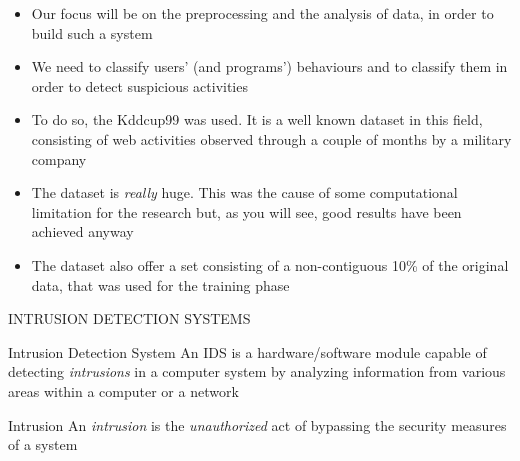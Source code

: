 	\begin{frame}
		\begin{itemize}
			\item Our focus will be on the preprocessing and the analysis of data, in order to build such a system
			\vspace{0.3cm}
			\item We need to classify users' (and programs') behaviours and to classify them in order to detect suspicious activities
			\vspace{0.3cm}			
			\item To do so, the Kddcup99 was used. It is a well known dataset in this field, consisting of web activities observed through a couple of months by a military company
			\vspace{0.3cm}
			\item The dataset is \emph{really} huge. This was the cause of some computational limitation for the research but, as you will see, good results have been achieved anyway
			\vspace{0.3cm}
			\item The dataset also offer a set consisting of a non-contiguous 10\% of the original data, that was used for the training phase
		\end{itemize}
	\end{frame}		
	
	\begin{frame}
		\begin{center}
			\begin{Huge}
				INTRUSION DETECTION SYSTEMS
			\end{Huge}
		\end{center}
	\end{frame}
	
	\begin{frame}
		\begin{block}{Intrusion Detection System}
			An IDS is a hardware/software module capable of detecting \emph{intrusions} in a computer system by analyzing information from various areas within a computer or a network
		\end{block}
		\vspace{0.3cm}
		\begin{block}{Intrusion}
			An \emph{intrusion} is the \emph{unauthorized} act of bypassing the security measures of a system
		\end{block}
	\end{frame}
	
